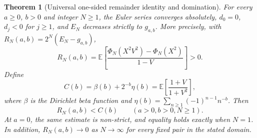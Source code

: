 \documentclass[11pt,letterpaper]{article}
\newtheorem{theorem}{Theorem}[section]
\theoremstyle{definition}
\theoremstyle{remark}
\begin{document}
\begin{theorem}[Universal one-sided remainder identity and domination]
\label{newEuler:thm:domination}
For every $a\ge0$, $b>0$ and integer $N\ge1$, the Euler series
converges absolutely, $d_0=0$, $d_j<0$ for $j\ge1$, and
$E_N$ decreases strictly to $g_{a,b}$. More precisely, with
$R_N(a,b)=2^N(E_N-g_{a,b})$,
\begin{equation}\label{newEuler:eq:R}
 R_N(a,b)=\mathbb E\!\left[
 \frac{\Phi_N(X^2V^2)-\Phi_N(X^2)}{1-V}\right]>0.
\end{equation}
Define
\begin{equation}\label{newEuler:eq:C}
 C(b)=\beta(b)+2^{-b}\eta(b)
     =\mathbb E\!\left[\frac{1+V}{1+V^2}\right],
\end{equation}
where $\beta$ is the Dirichlet beta function and
$\eta(b)=\sum_{n\ge1}(-1)^{n-1}n^{-b}$. Then
\begin{equation}\label{newEuler:eq:fixedb}
 R_N(a,b)<C(b)\qquad(a>0,b>0,N\ge1).
\end{equation}
At $a=0$, the same estimate is non-strict, and equality holds exactly
when $N=1$. In addition, $R_N(a,b)\to0$ as $N\to\infty$ for every
fixed pair in the stated domain.
\end{theorem}
\end{document}
